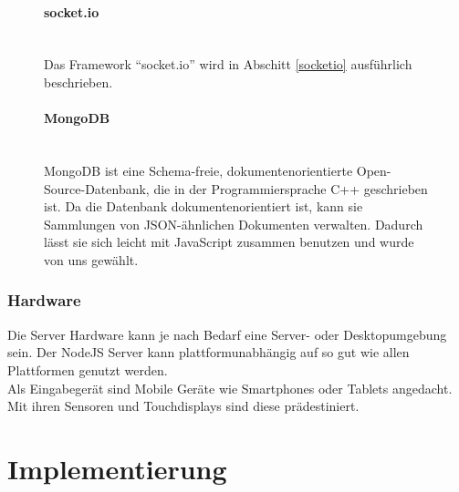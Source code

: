 \documentclass[a4paper]{spie}  %
\begin{document}
\begin{figure}[H]
\begin{minipage}[t]{0.4\textwidth}
\vspace{0pt}
\paragraph{socket.io}\mbox{}\\
Das Framework \enquote{socket.io} wird in Abschitt \ref{socketio} ausführlich beschrieben.
\end{minipage}
\hfill
\begin{minipage}[t]{0.5\textwidth}
\vspace{0pt}
\paragraph{MongoDB}\mbox{}\\
MongoDB ist eine Schema-freie, dokumentenorientierte Open-Source-Datenbank, die in der Programmiersprache C++ geschrieben ist. Da die Datenbank dokumentenorientiert ist, kann sie Sammlungen von JSON-ähnlichen Dokumenten verwalten. Dadurch lässt sie sich leicht mit JavaScript zusammen benutzen und wurde von uns gewählt.
\end{minipage}
\end{figure}


\subsubsection{Hardware}
Die Server Hardware kann je nach Bedarf eine Server- oder Desktopumgebung sein. Der NodeJS Server kann plattformunabhängig auf so gut wie allen Plattformen genutzt werden.\\
Als Eingabegerät sind Mobile Geräte wie Smartphones oder Tablets angedacht. Mit ihren Sensoren und Touchdisplays sind diese prädestiniert.
%
%

\section{Implementierung}
\end{document}
